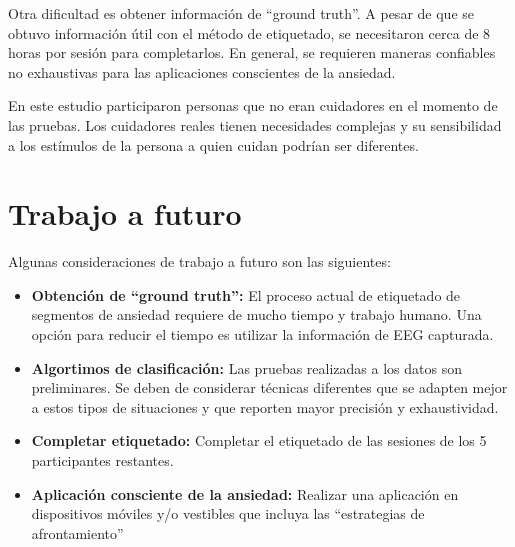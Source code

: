 	Otra dificultad es obtener informaci\'on de ``ground truth''. A pesar de que se obtuvo informaci\'on \'util con el m\'etodo de etiquetado, se necesitaron cerca de 8 horas por sesi\'on para completarlos. En general, se requieren maneras confiables no exhaustivas para las aplicaciones conscientes de la ansiedad.

	En este estudio participaron personas que no eran cuidadores en el momento de las pruebas. Los cuidadores reales tienen necesidades complejas y su sensibilidad a los est\'imulos de la persona a quien cuidan podr\'ian ser diferentes.
\section{Trabajo a futuro}
Algunas consideraciones de trabajo a futuro son las siguientes:

\begin{itemize}
	\item \textbf{Obtenci\'on de ``ground truth'':} El proceso actual de etiquetado de segmentos de ansiedad requiere de mucho tiempo y trabajo humano. Una opci\'on para reducir el tiempo es utilizar la informaci\'on de EEG capturada.
	\item \textbf{Algortimos de clasificaci\'on:} Las pruebas realizadas a los datos son preliminares. Se deben de considerar t\'ecnicas diferentes que se adapten mejor a estos tipos de situaciones y que reporten mayor precisi\'on y exhaustividad.
	\item \textbf{Completar etiquetado:} Completar el etiquetado de las sesiones de los 5 participantes restantes.
	\item \textbf{Aplicaci\'on consciente de la ansiedad:} Realizar una aplicaci\'on en dispositivos m\'oviles y/o vestibles que incluya las ``estrategias de afrontamiento''
\end{itemize}
